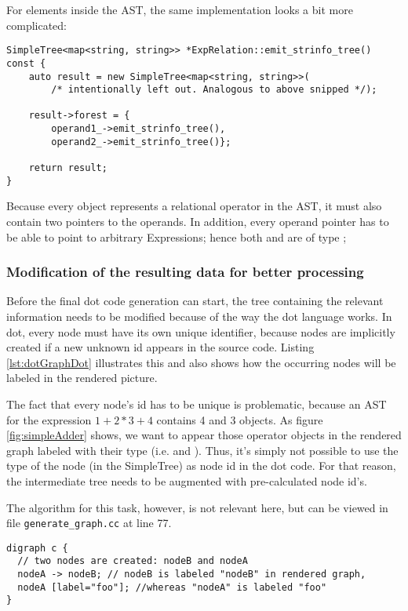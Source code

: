 For elements inside the AST, the same implementation looks a bit more
complicated:
\begin{lstlisting}[style=c++]
SimpleTree<map<string, string>> *ExpRelation::emit_strinfo_tree() const {
    auto result = new SimpleTree<map<string, string>>(
        /* intentionally left out. Analogous to above snipped */);

    result->forest = {
        operand1_->emit_strinfo_tree(),
        operand2_->emit_strinfo_tree()};

    return result;
}
\end{lstlisting}
%
Because every  object represents a relational
operator in the AST, it must also contain two pointers to the
operands. In addition, every operand pointer has to be able to point
to arbitrary Expressions; hence both  and
 are of type ;

\subsubsection{Modification of the resulting data for better processing}
Before the final dot code generation can start, the tree containing
the relevant information needs to be modified because of the way the
dot language works. In dot, every node must have its own unique
identifier, because nodes are implicitly created if a new unknown id
appears in the source code. Listing \ref{lst:dotGraphDot} illustrates
this and also shows how
the occurring nodes will be labeled in the rendered picture.

The fact that every node's id has to be unique is problematic, because
an AST for the expression \(1+2*3+4\) contains 4  and 3
 objects. As figure \ref{fig:simpleAdder} shows, we
want to appear those operator objects in the rendered graph labeled
with their type (i.e.  and ). Thus,
it's simply not possible to use the type of the node (in the
SimpleTree) as node id in the dot code. For that reason, the
intermediate tree needs to be augmented with pre-calculated node id's.

The algorithm for this task, however, is not relevant here, but can be
viewed in file \texttt{generate_graph.cc} at line 77.

\begin{lstlisting}[style=c, caption={A sample graph in dot},
    label={lst:dotGraphDot}]
digraph c {
  // two nodes are created: nodeB and nodeA
  nodeA -> nodeB; // nodeB is labeled "nodeB" in rendered graph,
  nodeA [label="foo"]; //whereas "nodeA" is labeled "foo"
}
\end{lstlisting}

